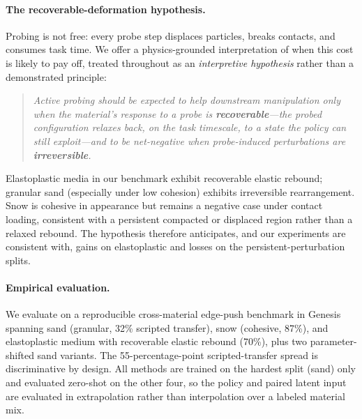 \paragraph{The recoverable-deformation hypothesis.}
Probing is not free: every probe step displaces particles, breaks contacts, and consumes task time. We offer a physics-grounded interpretation of when this cost is likely to pay off, treated throughout as an \emph{interpretive hypothesis} rather than a demonstrated principle:
\begin{quote}
\emph{Active probing should be expected to help downstream manipulation only when the material's response to a probe is \textbf{recoverable}---the probed configuration relaxes back, on the task timescale, to a state the policy can still exploit---and to be net-negative when probe-induced perturbations are \textbf{irreversible}.}
\end{quote}
Elastoplastic media in our benchmark exhibit recoverable elastic rebound; granular sand (especially under low cohesion) exhibits irreversible rearrangement. Snow is cohesive in appearance but remains a negative case under contact loading, consistent with a persistent compacted or displaced region rather than a relaxed rebound. The hypothesis therefore anticipates, and our experiments are consistent with, gains on elastoplastic and losses on the persistent-perturbation splits.

\paragraph{Empirical evaluation.}
We evaluate \PTA{} on a reproducible cross-material edge-push benchmark in Genesis~\cite{genesis2024} spanning sand (granular, 32\% scripted transfer), snow (cohesive, 87\%), and elastoplastic medium with recoverable elastic rebound (70\%), plus two parameter-shifted sand variants. The 55-percentage-point scripted-transfer spread is discriminative by design. All methods are trained on the hardest split (sand) only and evaluated zero-shot on the other four, so the policy and paired latent input are evaluated in extrapolation rather than interpolation over a labeled material mix.

